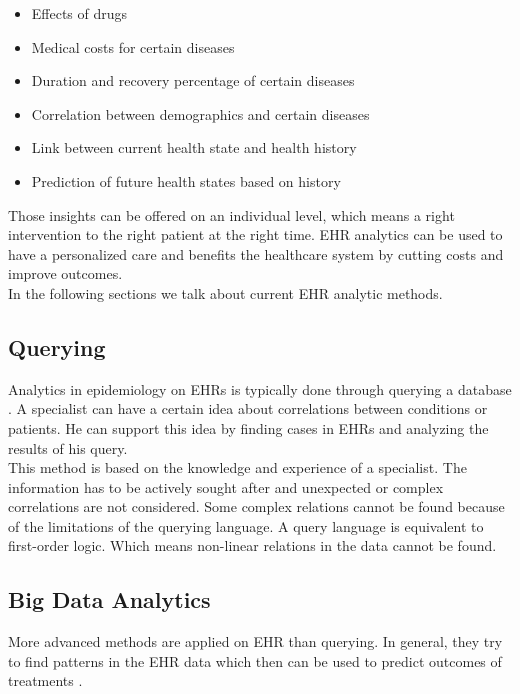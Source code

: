 \begin{itemize}

\item Effects of drugs
\item Medical costs for certain diseases
\item Duration and recovery percentage of certain diseases
\item Correlation between demographics and certain diseases
\item Link between current health state and health history
\item Prediction of future health states based on history

\end{itemize}

Those insights can be offered on an individual level, which means a right intervention to the right patient at the right time. EHR analytics can be used to have a personalized care and benefits the healthcare system by cutting costs and improve outcomes. \\

In the following sections we talk about current EHR analytic methods.


\subsection{Querying}

Analytics in epidemiology on EHRs is typically done through querying a database \cite{EHRquery:journal}. A specialist can have a certain idea about correlations between conditions or patients. He can support this idea by finding cases in EHRs and analyzing the results of his query. \\
This method is based on the knowledge and experience of a specialist. The information has to be actively sought after and unexpected or complex correlations are not considered. Some complex relations cannot be found because of the limitations of the querying language. A query language is equivalent to first-order logic. Which means non-linear relations in the data cannot be found.

\subsection{Big Data Analytics}

More advanced methods are applied on EHR than querying. In general, they try to find patterns in the EHR data which then can be used to predict outcomes of treatments \cite{EHRbigdata:slides}. \\

